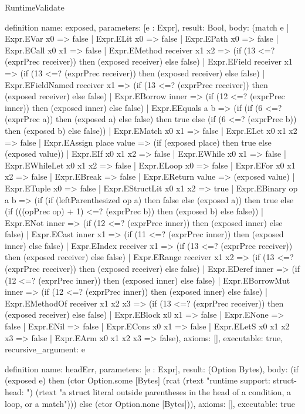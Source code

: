 \begin{lexlean}{RuntimeValidate}
\begin{semanticmodule}
definition{
  name: exposed,
  parameters: [e : Expr],
  result: Bool,
  body: (match e
    | Expr.EVar x0 => false
    | Expr.ELit x0 => false
    | Expr.EPath x0 => false
    | Expr.ECall x0 x1 => false
    | Expr.EMethod receiver x1 x2 => (if (13 <=? (exprPrec receiver)) then (exposed receiver) else false)
    | Expr.EField receiver x1 => (if (13 <=? (exprPrec receiver)) then (exposed receiver) else false)
    | Expr.EFieldNamed receiver x1 => (if (13 <=? (exprPrec receiver)) then (exposed receiver) else false)
    | Expr.EBorrow inner => (if (12 <=? (exprPrec inner)) then (exposed inner) else false)
    | Expr.EEquals a b => (if (if (6 <=? (exprPrec a)) then (exposed a) else false) then true else (if (6 <=? (exprPrec b)) then (exposed b) else false))
    | Expr.EMatch x0 x1 => false
    | Expr.ELet x0 x1 x2 => false
    | Expr.EAssign place value => (if (exposed place) then true else (exposed value))
    | Expr.EIf x0 x1 x2 => false
    | Expr.EWhile x0 x1 => false
    | Expr.EWhileLet x0 x1 x2 => false
    | Expr.ELoop x0 => false
    | Expr.EFor x0 x1 x2 => false
    | Expr.EBreak => false
    | Expr.EReturn value => (exposed value)
    | Expr.ETuple x0 => false
    | Expr.EStructLit x0 x1 x2 => true
    | Expr.EBinary op a b => (if (if (leftParenthesized op a) then false else (exposed a)) then true else (if (((opPrec op) + 1) <=? (exprPrec b)) then (exposed b) else false))
    | Expr.ENot inner => (if (12 <=? (exprPrec inner)) then (exposed inner) else false)
    | Expr.ECast inner x1 => (if (11 <=? (exprPrec inner)) then (exposed inner) else false)
    | Expr.EIndex receiver x1 => (if (13 <=? (exprPrec receiver)) then (exposed receiver) else false)
    | Expr.ERange receiver x1 x2 => (if (13 <=? (exprPrec receiver)) then (exposed receiver) else false)
    | Expr.EDeref inner => (if (12 <=? (exprPrec inner)) then (exposed inner) else false)
    | Expr.EBorrowMut inner => (if (12 <=? (exprPrec inner)) then (exposed inner) else false)
    | Expr.EMethodOf receiver x1 x2 x3 => (if (13 <=? (exprPrec receiver)) then (exposed receiver) else false)
    | Expr.EBlock x0 x1 => false
    | Expr.ENone => false
    | Expr.ENil => false
    | Expr.ECons x0 x1 => false
    | Expr.ELetS x0 x1 x2 x3 => false
    | Expr.EArm x0 x1 x2 x3 => false),
  axioms: [],
  executable: true,
  recursive_argument: e
}

definition{
  name: headErr,
  parameters: [e : Expr],
  result: (Option Bytes),
  body: (if (exposed e) then (ctor Option.some [Bytes] (rcat (rtext "runtime support: struct-head: ") (rtext "a struct literal outside parentheses in the head of a condition, a loop, or a match"))) else (ctor Option.none [Bytes])),
  axioms: [],
  executable: true
}


\end{semanticmodule}
\end{lexlean}

